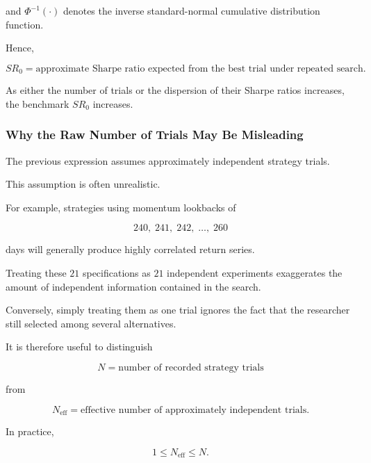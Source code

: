 \documentclass[11pt,a4paper]{article}
\begin{document}
and $\Phi^{-1}(\cdot)$ denotes the inverse standard-normal cumulative
distribution function.

Hence,

\begin{equation}
\boxed{
SR_0
=
\text{approximate Sharpe ratio expected from the best trial under repeated
search}.
}
\end{equation}

As either the number of trials or the dispersion of their Sharpe ratios
increases, the benchmark $SR_0$ increases.


\subsubsection{Why the Raw Number of Trials May Be Misleading}

The previous expression assumes approximately independent strategy trials.

This assumption is often unrealistic.

For example, strategies using momentum lookbacks of

\begin{equation}
240,\;241,\;242,\;\ldots,\;260
\end{equation}

days will generally produce highly correlated return series.

Treating these $21$ specifications as $21$ independent experiments exaggerates
the amount of independent information contained in the search.

Conversely, simply treating them as one trial ignores the fact that the
researcher still selected among several alternatives.

It is therefore useful to distinguish

\begin{equation}
N
=
\text{number of recorded strategy trials}
\end{equation}

from

\begin{equation}
\boxed{
N_{\mathrm{eff}}
=
\text{effective number of approximately independent trials}.
}
\end{equation}

In practice,

\begin{equation}
1
\leq
N_{\mathrm{eff}}
\leq
N.
\end{equation}
\end{document}
